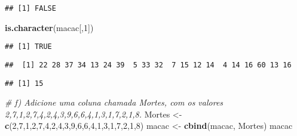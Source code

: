 \documentclass[]{article}
\newenvironment{Shaded}{\begin{snugshade}}{\end{snugshade}}
\newcommand{\CommentTok}[1]{\textcolor[rgb]{0.56,0.35,0.01}{\textit{#1}}}
\newcommand{\DecValTok}[1]{\textcolor[rgb]{0.00,0.00,0.81}{#1}}
\newcommand{\KeywordTok}[1]{\textcolor[rgb]{0.13,0.29,0.53}{\textbf{#1}}}
\newcommand{\NormalTok}[1]{#1}
\newcommand{\OperatorTok}[1]{\textcolor[rgb]{0.81,0.36,0.00}{\textbf{#1}}}
\newcommand{\StringTok}[1]{\textcolor[rgb]{0.31,0.60,0.02}{#1}}
\begin{document}
\begin{verbatim}
## [1] FALSE
\end{verbatim}

\begin{Shaded}
\begin{Highlighting}[]
\KeywordTok{is.character}\NormalTok{(macac[,}\DecValTok{1}\NormalTok{])}
\end{Highlighting}
\end{Shaded}

\begin{verbatim}
## [1] TRUE
\end{verbatim}

\begin{Shaded}
\end{Shaded}

\begin{verbatim}
##  [1] 22 28 37 34 13 24 39  5 33 32  7 15 12 14  4 14 16 60 13 16
\end{verbatim}

\begin{Shaded}
\end{Shaded}

\begin{verbatim}
## [1] 15
\end{verbatim}

\begin{Shaded}
\begin{Highlighting}[]
\CommentTok{# f) Adicione uma coluna chamada Mortes, com os valores 2,7,1,2,7,4,2,4,3,9,6,6,4,1,3,1,7,2,1,8.}
\NormalTok{Mortes <-}\StringTok{ }\KeywordTok{c}\NormalTok{(}\DecValTok{2}\NormalTok{,}\DecValTok{7}\NormalTok{,}\DecValTok{1}\NormalTok{,}\DecValTok{2}\NormalTok{,}\DecValTok{7}\NormalTok{,}\DecValTok{4}\NormalTok{,}\DecValTok{2}\NormalTok{,}\DecValTok{4}\NormalTok{,}\DecValTok{3}\NormalTok{,}\DecValTok{9}\NormalTok{,}\DecValTok{6}\NormalTok{,}\DecValTok{6}\NormalTok{,}\DecValTok{4}\NormalTok{,}\DecValTok{1}\NormalTok{,}\DecValTok{3}\NormalTok{,}\DecValTok{1}\NormalTok{,}\DecValTok{7}\NormalTok{,}\DecValTok{2}\NormalTok{,}\DecValTok{1}\NormalTok{,}\DecValTok{8}\NormalTok{)}
\NormalTok{macac <-}\StringTok{ }\KeywordTok{cbind}\NormalTok{(macac, Mortes)}
\NormalTok{macac}
\end{Highlighting}
\end{Shaded}
\end{document}
